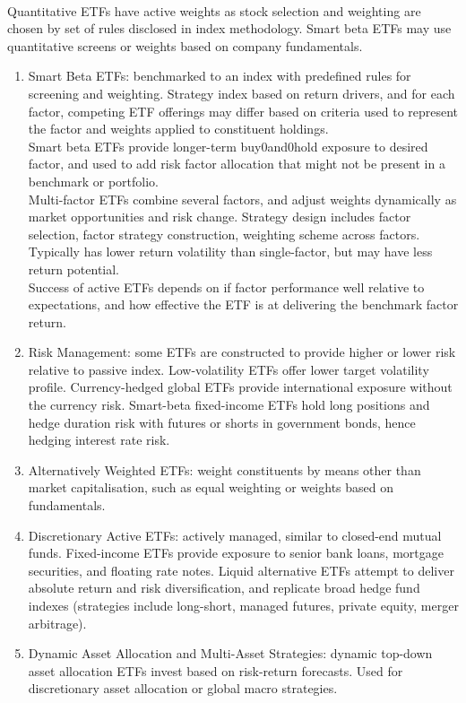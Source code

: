 \begin{remark}  \\
Quantitative ETFs have active weights as stock selection and weighting are chosen by set of rules disclosed in index methodology. Smart beta ETFs may use quantitative screens or weights based on company fundamentals.
\begin{enumerate}[label=\roman*.]
\setlength{\itemsep}{0pt}
\item Smart Beta ETFs: benchmarked to an index with predefined rules for screening and weighting. Strategy index based on return drivers, and for each factor, competing ETF offerings may differ based on criteria used to represent the factor and weights applied to constituent holdings.\\
Smart beta ETFs provide longer-term buy0and0hold exposure to desired factor, and used to add risk factor allocation that might not be present in a benchmark or portfolio.\\
Multi-factor ETFs combine several factors, and adjust weights dynamically as market opportunities and risk change. Strategy design includes factor selection, factor strategy construction, weighting scheme across factors. Typically has lower return volatility than single-factor, but may have less return potential.\\
Success of active ETFs depends on if factor performance well relative to expectations, and how effective the ETF is at delivering the benchmark factor return.
\item Risk Management: some ETFs are constructed to provide higher or lower risk relative to passive index. Low-volatility ETFs offer lower target volatility profile. Currency-hedged global ETFs provide international exposure without the currency risk. Smart-beta fixed-income ETFs hold long positions and hedge duration risk with futures or shorts in government bonds, hence hedging interest rate risk.
\item Alternatively Weighted ETFs: weight constituents by means other than market capitalisation, such as equal weighting or weights based on fundamentals.
\item Discretionary Active ETFs: actively managed, similar to closed-end mutual funds. Fixed-income ETFs provide exposure to senior bank loans, mortgage securities, and floating rate notes. Liquid alternative ETFs attempt to deliver absolute return and risk diversification, and replicate broad hedge fund indexes (strategies include long-short, managed futures, private equity, merger arbitrage).
\item Dynamic Asset Allocation and Multi-Asset Strategies: dynamic top-down asset allocation ETFs invest based on risk-return forecasts. Used for discretionary asset allocation or global macro strategies.
\end{enumerate}
\end{remark}